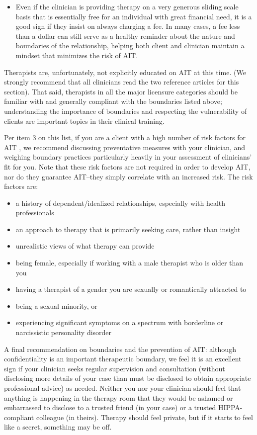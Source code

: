 \documentclass[12pt,letterpaper]{book}
\begin{document}
\begin{itemize}
    \item Even if the clinician is providing therapy on a very generous sliding scale basis that is essentially free for an individual with great financial need, it is a good sign if they insist on always charging a fee. In many cases, a fee less than a dollar can still serve as a healthy reminder about the nature and boundaries of the relationship, helping both client and clinician maintain a mindset that minimizes the risk of AIT.
\end{itemize}
Therapists are, unfortunately, not explicitly educated on AIT at this time. (We strongly recommend that all clinicians read the two reference articles for this section). That said, therapists in all the major licensure categories should be familiar with and generally compliant with the boundaries listed above; understanding the importance of boundaries and respecting the vulnerability of clients are important topics in their clinical training.

Per item 3 on this list, if you are a client with a high number of risk factors for AIT \cite{transferranceLoveHarm,hook2018boundary}, we recommend discussing preventative measures with your clinician, and weighing boundary practices particularly heavily in your assessment of clinicians' fit for you. Note that these risk factors are not required in order to develop AIT, nor do they guarantee AIT–they simply correlate with an increased risk. The risk factors are:
\begin{itemize}
    \item a history of dependent/idealized relationships, especially with health professionals
    \item an approach to therapy that is primarily seeking care, rather than insight
    \item unrealistic views of what therapy can provide
    \item being female, especially if working with a male therapist who is older than you
    \item having a therapist of a gender you are sexually or romantically attracted to
    \item being a sexual minority, or
    \item experiencing significant symptoms on a spectrum with borderline or narcissistic personality disorder
\end{itemize}

A final recommendation on boundaries and the prevention of AIT: although confidentiality is an important therapeutic boundary, we feel it is an excellent sign if your clinician seeks regular supervision and consultation (without disclosing more details of your case than must be disclosed to obtain appropriate professional advice) as needed. Neither you nor your clinician should feel that anything is happening in the therapy room that they would be ashamed or embarrassed to disclose to a trusted friend (in your case) or a trusted HIPPA-compliant colleague (in theirs). Therapy should feel private, but if it starts to feel like a secret, something may be off.
\end{document}
